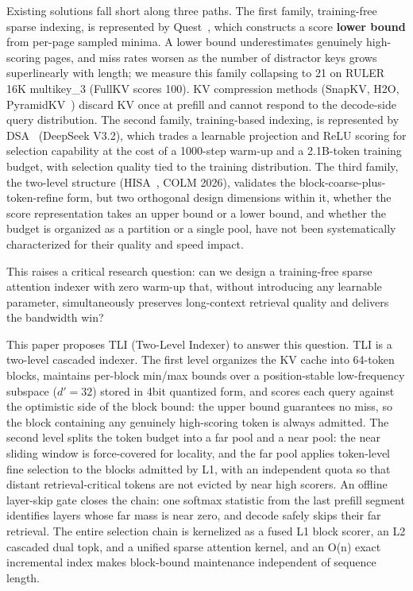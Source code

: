 \documentclass[11pt]{article}
\begin{document}
Existing solutions fall short along three paths. The first family, training-free sparse indexing, is represented by Quest~\cite{quest}, which constructs a score \textbf{lower bound} from per-page sampled minima. A lower bound underestimates genuinely high-scoring pages, and miss rates worsen as the number of distractor keys grows superlinearly with length; we measure this family collapsing to 21 on RULER 16K multikey\_3 (FullKV scores 100). KV compression methods (SnapKV, H2O, PyramidKV~\cite{snapkv,h2o,pyramidkv}) discard KV once at prefill and cannot respond to the decode-side query distribution. The second family, training-based indexing, is represented by DSA~\cite{dsa} (DeepSeek V3.2), which trades a learnable projection and ReLU scoring for selection capability at the cost of a 1000-step warm-up and a 2.1B-token training budget, with selection quality tied to the training distribution. The third family, the two-level structure (HISA~\cite{hisa}, COLM 2026), validates the block-coarse-plus-token-refine form, but two orthogonal design dimensions within it, whether the score representation takes an upper bound or a lower bound, and whether the budget is organized as a partition or a single pool, have not been systematically characterized for their quality and speed impact.

This raises a critical research question: can we design a training-free sparse attention indexer with zero warm-up that, without introducing any learnable parameter, simultaneously preserves long-context retrieval quality and delivers the bandwidth win?

This paper proposes TLI (Two-Level Indexer) to answer this question. TLI is a two-level cascaded indexer. The first level organizes the KV cache into 64-token blocks, maintains per-block min/max bounds over a position-stable low-frequency subspace ($d'{=}32$) stored in 4bit quantized form, and scores each query against the optimistic side of the block bound: the upper bound guarantees no miss, so the block containing any genuinely high-scoring token is always admitted. The second level splits the token budget into a far pool and a near pool: the near sliding window is force-covered for locality, and the far pool applies token-level fine selection to the blocks admitted by L1, with an independent quota so that distant retrieval-critical tokens are not evicted by near high scorers. An offline layer-skip gate closes the chain: one softmax statistic from the last prefill segment identifies layers whose far mass is near zero, and decode safely skips their far retrieval. The entire selection chain is kernelized as a fused L1 block scorer, an L2 cascaded dual topk, and a unified sparse attention kernel, and an O(n) exact incremental index makes block-bound maintenance independent of sequence length.
\end{document}
